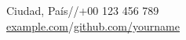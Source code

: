 {\Huge\bfseries\yourname}\par
\vspace{3pt}{\large\color{accent}\yourrole}\par
\vspace{5pt}
{\small Ciudad, País\quad /\quad\href{mailto:\youremail}{\youremail}\quad /\quad +00 123 456 789\\
\href{https://example.com}{example.com}\quad /\quad\href{https://github.com/yourname}{github.com/yourname}}
